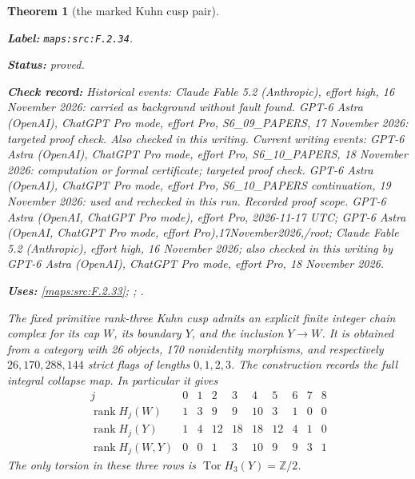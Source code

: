 \documentclass[11pt,a4paper]{article}
\newtheorem{theorem}{Theorem}[section]
\theoremstyle{definition}
\newcommand{\StatementRecord}[4]{\par\smallskip\begingroup\upshape\raggedright\noindent\textbf{Label:} \nolinkurl{#1}.\par\noindent\textbf{Status:} #2.\par\noindent\textbf{Check record:} #3.\par\noindent\textbf{Uses:} #4.\par\endgroup\smallskip}
\begin{document}
\begin{theorem}[the marked Kuhn cusp pair]\label{maps:src:F.2.34}
\StatementRecord{maps:src:F.2.34}{proved}{Historical events: Claude Fable 5.2 (Anthropic), effort high, 16 November 2026: carried as background without fault found. GPT-6 Astra (OpenAI), ChatGPT Pro mode, effort Pro, S6\_09\_PAPERS, 17 November 2026: targeted proof check. Also checked in this writing. Current writing events: GPT-6 Astra (OpenAI), ChatGPT Pro mode, effort Pro, S6\_10\_PAPERS, 18 November 2026: computation or formal certificate; targeted proof check. GPT-6 Astra (OpenAI), ChatGPT Pro mode, effort Pro, S6\_10\_PAPERS continuation, 19 November 2026: used and rechecked in this run. \emph{Recorded proof scope.} GPT-6 Astra (OpenAI, ChatGPT Pro mode), effort Pro, 2026-11-17 UTC; GPT-6 Astra (OpenAI, ChatGPT Pro mode, effort Pro),17November2026,/root; Claude Fable 5.2 (Anthropic), effort high, 16 November 2026; also checked in this writing by GPT-6 Astra (OpenAI), ChatGPT Pro mode, effort Pro, 18 November 2026}{\cref{maps:src:F.2.33}; \cite[Theorem 4.1.1 and Lemmas 4.1.2--4.1.3, pp.~480--482]{ffAchingerOgus20}; \cite[Theorem 8.7, pp.~57--59, and Corollary 8.8, p.~59, attached source build]{manYang26}}


The fixed primitive rank-three Kuhn cusp admits an explicit
finite integer chain complex for its cap $W$, its boundary
$Y$, and the inclusion $Y\to W$.  It is obtained from a
category with 26 objects, 170 nonidentity morphisms, and
respectively $26,170,288,144$ strict flags of lengths
$0,1,2,3$.  The construction records the full integral
collapse map.  In particular it gives
\[
\begin{array}{c|rrrrrrrrr}
j&0&1&2&3&4&5&6&7&8\\\hline
\operatorname{rank}H_j(W)&1&3&9&9&10&3&1&0&0\\
\operatorname{rank}H_j(Y)&1&4&12&18&18&12&4&1&0\\
\operatorname{rank}H_j(W,Y)&0&0&1&3&10&9&9&3&1
\end{array}                                                \tag{F.CK1}\label{maps:eq:F.CK1}
\]
The only torsion in these three rows is
$\operatorname{Tor}H_3(Y)=\mathbb Z/2$.

\end{theorem}
\end{document}
